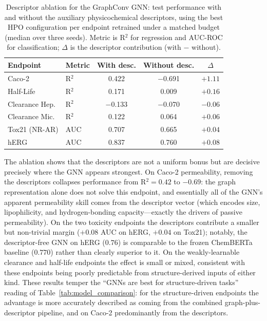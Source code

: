 \documentclass[journal]{IEEEtran}
\begin{document}
\begin{table}[!t]
\centering
\caption{Descriptor ablation for the GraphConv GNN: test performance with and without the auxiliary physicochemical descriptors, using the best HPO configuration per endpoint retrained under a matched budget (median over three seeds). Metric is R$^2$ for regression and AUC-ROC for classification; $\Delta$ is the descriptor contribution (with $-$ without).}
\label{tab:descriptor_ablation}
\small
\setlength{\tabcolsep}{4pt}
\begin{tabular}{llccc}
\toprule
\textbf{Endpoint} & \textbf{Metric} & \textbf{With desc.} & \textbf{Without desc.} & \textbf{$\Delta$} \\
\midrule
Caco-2 & R$^2$ & 0.422 & $-$0.691 & $+1.11$ \\
Half-Life & R$^2$ & 0.171 & 0.009 & $+0.16$ \\
Clearance Hep. & R$^2$ & $-$0.133 & $-$0.070 & $-0.06$ \\
Clearance Mic. & R$^2$ & 0.122 & 0.064 & $+0.06$ \\
Tox21 (NR-AR) & AUC & 0.707 & 0.665 & $+0.04$ \\
hERG & AUC & 0.837 & 0.760 & $+0.08$ \\
\bottomrule
\end{tabular}
\end{table}

The ablation shows that the descriptors are not a uniform bonus but are decisive precisely where the GNN appears strongest. On Caco-2 permeability, removing the descriptors collapses performance from R$^2 = 0.42$ to $-0.69$: the graph representation alone does not solve this endpoint, and essentially all of the GNN's apparent permeability skill comes from the descriptor vector (which encodes size, lipophilicity, and hydrogen-bonding capacity---exactly the drivers of passive permeability). On the two toxicity endpoints the descriptors contribute a smaller but non-trivial margin ($+0.08$ AUC on hERG, $+0.04$ on Tox21); notably, the descriptor-free GNN on hERG ($0.76$) is comparable to the frozen ChemBERTa baseline ($0.770$) rather than clearly superior to it. On the weakly-learnable clearance and half-life endpoints the effect is small or mixed, consistent with these endpoints being poorly predictable from structure-derived inputs of either kind. These results temper the ``GNNs are best for structure-driven tasks'' reading of Table~\ref{tab:model_comparison}: for the structure-driven endpoints the advantage is more accurately described as coming from the combined graph-plus-descriptor pipeline, and on Caco-2 predominantly from the descriptors.
\end{document}
